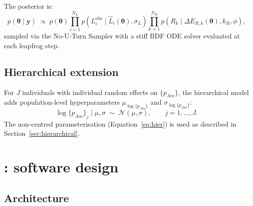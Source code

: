 \documentclass[article,shortnames]{jss}
\newcommand{\pAm}{\{p_{Am}\}}
\begin{document}
The posterior is:
\begin{equation}
  p(\boldsymbol{\theta} \mid \mathbf{y}) \;\propto\;
  p(\boldsymbol{\theta}) \prod_{i=1}^{N_L}
  p(L_i^{\mathrm{obs}} \mid \hat{L}_i(\boldsymbol{\theta}), \sigma_L)
  \prod_{k=1}^{N_R}
  p(R_k \mid \Delta E_{R,k}(\boldsymbol{\theta}), k_R, \phi),
  \label{eq:posterior}
\end{equation}
sampled via the No-U-Turn Sampler \citep[NUTS;][]{HoffmanNUTS2014}
with a stiff BDF ODE solver evaluated at each leapfrog step.

\subsection{Hierarchical extension}

For $J$ individuals with individual random effects on $\pAm$, the
hierarchical model adds population-level hyperparameters
$\mu_{\log \pAm}$ and $\sigma_{\log \pAm}$:
\begin{equation}
  \log \pAm_j \mid \mu, \sigma \;\sim\; \mathcal{N}(\mu, \sigma),
  \qquad j = 1, \ldots, J.
  \label{eq:hier_formal}
\end{equation}
The non-centred parameterisation (Equation~\ref{eq:hier}) is used
as described in Section~\ref{sec:hierarchical}.


\section[BayesianDEB: software design]{%
  : software design} \label{sec:design}

\subsection{Architecture} \label{sec:architecture}
\end{document}

